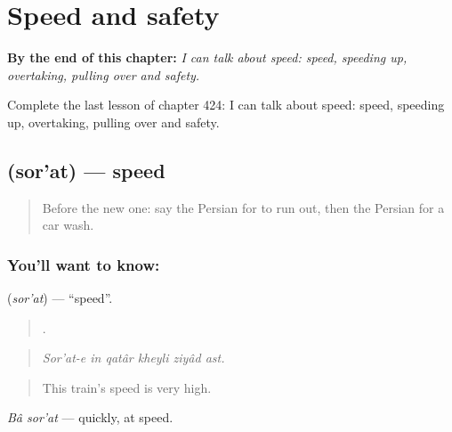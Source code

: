 
\chapter{Speed and safety}
\label{ch:fa-speed-and-safety}

\begin{chapteropening}
\textbf{By the end of this chapter:} \emph{I can talk about speed: speed, speeding up, overtaking, pulling over and safety.}

Complete the last lesson of chapter 424: I can talk about speed: speed, speeding up, overtaking, pulling over and safety.
\end{chapteropening}

\section[\texorpdfstring{\fa{سرعت} (sor'at)}{سرعت (sor'at)}]{ (sor'at) — speed}

\label{lesson:FA-C424-sorat}



\begin{quote}
Before the new one: say the Persian for to run out, then the Persian for a car wash.
\end{quote}

\subsection*{You'll want to know: }
\textbf{} (\emph{sor'at}) — \textquotedblleft{}speed\textquotedblright{}.

\begin{quote}
     .
\end{quote}

\begin{quote}
\emph{Sor'at-e in qatâr kheyli ziyâd ast.}
\end{quote}

\begin{quote}
This train's speed is very high.
\end{quote}

\emph{Bâ sor'at} — quickly, at speed.

